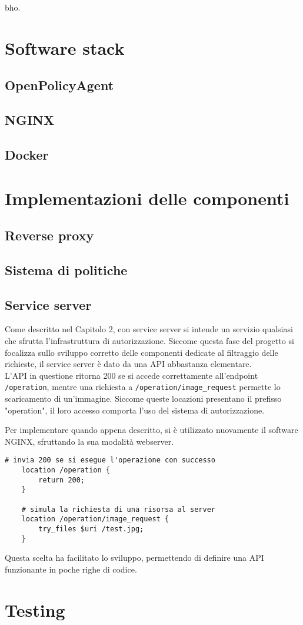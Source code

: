 bho.

\section{Software stack}
\subsection{OpenPolicyAgent}
\subsection{NGINX}
\subsection{Docker}
\section{Implementazioni delle componenti}
\subsection{Reverse proxy}
\subsection{Sistema di politiche}
\subsection{Service server}
Come descritto nel Capitolo 2, con service server si intende un servizio qualsiasi che sfrutta l'infrastruttura di autorizzazione. 
Siccome questa fase del progetto si focalizza sullo sviluppo corretto delle componenti dedicate 
al filtraggio delle richieste, il service server è dato da una API abbastanza elementare. \\
L'API in questione ritorna 200 se si accede correttamente all'endpoint \texttt{/operation}, 
mentre una richiesta a \texttt{/operation/image\_request} permette lo scaricamento di 
un'immagine. Siccome queste locazioni presentano il prefisso "operation", il loro accesso comporta l'uso 
del sistema di autorizzazione.

Per implementare quando appena descritto, si è utilizzato nuovamente il software NGINX, 
sfruttando la sua modalità webserver.
\lstset{language=nginx}
\begin{lstlisting}[caption={sda},captionpos=b,label=nginx_web]
    # invia 200 se si esegue l'operazione con successo
    location /operation {
        return 200;
    }

    # simula la richiesta di una risorsa al server
    location /operation/image_request {
        try_files $uri /test.jpg;
    }
\end{lstlisting}
Questa scelta ha facilitato lo sviluppo, permettendo di definire una API funzionante in poche righe di codice.  



\section{Testing}